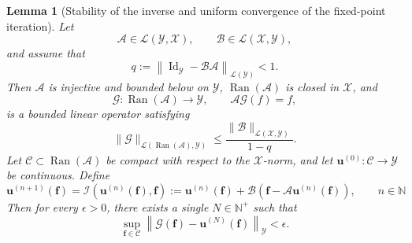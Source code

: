 \documentclass[preprint,numbers,sort&compress]{elsarticle}
\newtheorem{lemma}{Lemma}
\begin{document}
			
			
			\begin{lemma}[Stability of the inverse and uniform convergence of the fixed-point iteration]
				\label{lem:freq_trunc_init_appro} 
				Let
				\[
				\mathcal A\in\mathcal L(\mathcal Y,\mathcal X),
				\qquad
				\mathcal B\in\mathcal L(\mathcal X,\mathcal Y),
				\]
				and assume that
				\[
				q
				:=
				\left\|
				\operatorname{Id}_{\mathcal Y}
				-
				\mathcal B\mathcal A
				\right\|_{\mathcal L(\mathcal Y)}
				<1.
				\]
				Then $\mathcal A$ is injective and bounded below on $\mathcal Y$,
				$\operatorname{Ran}(\mathcal A)$ is closed in $\mathcal X$, and
				\[
				\mathcal G: \operatorname{Ran}(\mathcal A)\to\mathcal Y,
				\qquad
				\mathcal A\mathcal G(f)=f,
				\]
				is a bounded linear operator satisfying
				\[
				\|\mathcal G\|_{\mathcal L(\operatorname{Ran}(\mathcal A),\mathcal Y)}
				\leq
				\frac{\|\mathcal B\|_{\mathcal L(\mathcal X,\mathcal Y)}}{1-q}.
				\]
				Let $\mathcal C\subset\operatorname{Ran}(\mathcal A)$ be compact
				with respect to the $\mathcal X$-norm, and let
				$\boldsymbol u^{(0)}:\mathcal C\to\mathcal Y$ be continuous.
				Define
				\begin{equation}
					\label{eq:iter_seq}
					\boldsymbol u^{(n+1)}(\boldsymbol f)
					=
					\mathcal I
					\left(
					\boldsymbol u^{(n)}(\boldsymbol f),
					\boldsymbol f
					\right)
					:=
					\boldsymbol u^{(n)}(\boldsymbol f)
					+
					\mathcal B
					\left(
					\boldsymbol f
					-
					\mathcal A\boldsymbol u^{(n)}(\boldsymbol f)
					\right), \qquad n \in \mathbb{N}
				\end{equation}
				Then for every $\epsilon>0$, there exists a single
				$N\in\mathbb N^+$ such that
				\[
				\sup_{\boldsymbol f\in\mathcal C}
				\left\|
				\mathcal G(\boldsymbol f)
				-
				\boldsymbol u^{(N)}(\boldsymbol f)
				\right\|_{\mathcal Y}
				<\epsilon.
				\]
			\end{lemma}
\end{document}
